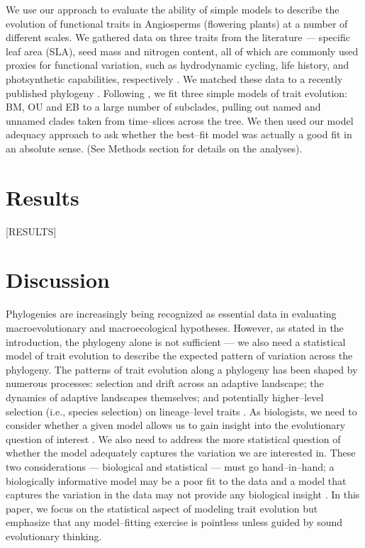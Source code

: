 \documentclass[a4paper,12pt]{article}
\begin{document}
We use our approach to evaluate the ability of simple models to describe the evolution of functional traits in Angiosperms (flowering plants) at a number of different scales. We gathered data on three traits from the literature --- specific leaf area (SLA), seed mass and nitrogen content, all of which are commonly used proxies for functional variation, such as hydrodynamic cycling, life history, and photsynthetic capabilities, respectively \citep{Westoby2002}. We  matched these data to a recently published phylogeny \citep{Zanne2013}. Following \citep{Harmon2010}, we fit three simple models of trait evolution: BM, OU and EB to a large number of subclades, pulling out named and unnamed clades taken from time--slices across the tree. We then used our model adequacy approach to ask whether the best--fit model was actually a good fit in an absolute sense. (See Methods section for details on the analyses). 

\section{Results}

[RESULTS]

\section{Discussion}

Phylogenies are increasingly being recognized as essential data in evaluating macroevolutionary and macroecological hypotheses. However, as stated in the introduction, the phylogeny alone is not sufficient --- we also need a statistical model of trait evolution to describe the expected pattern of variation across the phylogeny. The patterns of trait evolution along a phylogeny has been shaped by numerous processes: selection and drift across an adaptive landscape; the dynamics of adaptive landscapes themselves; and potentially higher--level selection (i.e., species selection) on lineage--level traits \citep{PennellPE}. As biologists, we need to consider whether a given model allows us to gain insight into the evolutionary question of interest \citep{HansenOrzack2005, Hansen2012}. We also need to address the more statistical question of whether the model adequately captures the variation we are interested in. These two considerations --- biological and statistical --- must go hand--in--hand; a biologically informative model may be a poor fit to the data and a model that captures the variation in the data may not provide any biological insight \citep{Hansen2012}. In this paper, we focus on the statistical aspect of modeling trait evolution but emphasize that any model--fitting exercise is pointless unless guided by sound evolutionary thinking.
\end{document}
